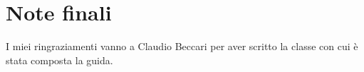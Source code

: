 

\chapter{Note finali}

I miei ringraziamenti vanno a Claudio Beccari per aver scritto la classe
 con cui è stata composta la guida.

